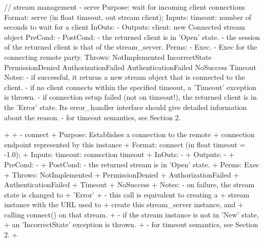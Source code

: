 \begin{myspec}
 
    // stream management
    - serve
      Purpose:  wait for incoming client connections
      Format:   serve                (in  float   timeout,
                                      out stream  client);
      Inputs:   timeout:              number of seconds to wait
                                      for a client
      InOuts:   -
      Outputs:  client:               new Connected stream object
      PreCond:  -
      PostCond: - the returned client is in 'Open' state.
                - the session of the returned client is that of 
                  the stream_server.
      Perms:    - Exec.
                - Exec for the connecting remote party.
      Throws:   NotImplemented
                IncorrectState
                PermissionDenied
                AuthorizationFailed
                AuthenticationFailed
                NoSuccess
                Timeout
      Notes:    - if successful, it returns a new stream object
                  that is connected to the client.
                - if no client connects within the specified 
                  timeout, a 'Timeout' exception is thrown.
                - if connection setup failed (not on timeout!),
                  the returned client is in the 'Error' state.
                  Its error_handler interface should give
                  detailed information about the reason.
                - for timeout semantics, see Section 2.

+
+   - connect
+     Purpose:  Establishes a connection to the remote
+               connection endpoint represented by this instance
+     Format:   connect              (in float timeout = -1.0);
+     Inputs:   timeout:              connection timeout
+     InOuts:   -
+     Outputs:  -
+     PreCond:  - 
+     PostCond: - the returned stream is in 'Open' state.
+     Perms:    Exec
+     Throws:   NotImplemented
+               PermissionDenied
+               AuthorizationFailed
+               AuthenticationFailed
+               Timeout
+               NoSuccess
+     Notes:    - on failure, the stream state is changed to
+                 'Error'
+               - this call is equivalent to creating a
+                 stream instance with the URL used to
+                 create this stream_server instance, and 
+                 calling connect() on that stream.
+               - if the stream instance is not in 'New' state,
+                 an 'IncorrectState' exception is thrown.
+               - for timeout semantics, see Section 2.
+


\end{myspec}
